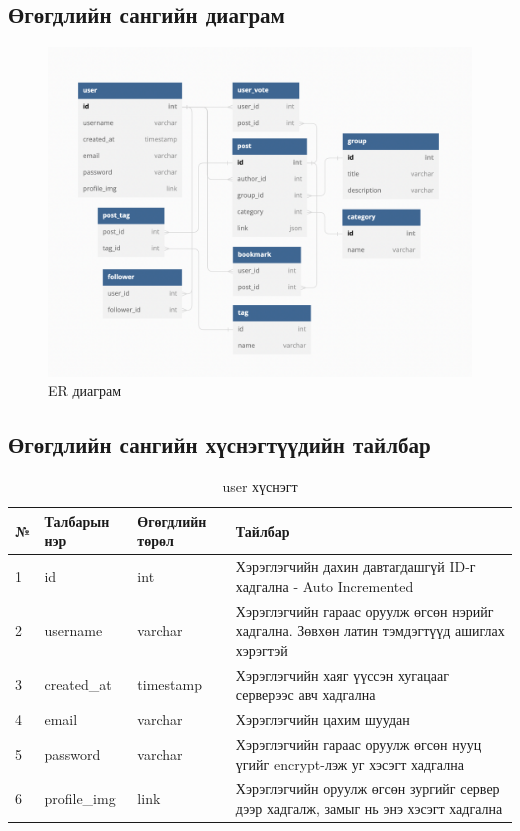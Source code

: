 \subsection{Өгөгдлийн сангийн диаграм}
\begin{figure}[h]
	\centering
	\includegraphics[width=15cm]{images/erdiagram.png}
	\caption{ER диаграм}
	\label{fig:erd}
\end{figure}

\subsection{Өгөгдлийн сангийн хүснэгтүүдийн тайлбар}

\begin{table}[h]
	\caption{user хүснэгт}
	\begin{tabular}{|l|l|l|p{8cm}|}
	\hline
	№ &  Талбарын нэр & Өгөгдлийн төрөл & Тайлбар \\ \hline
	1 &  id & int & Хэрэглэгчийн дахин давтагдашгүй ID-г хадгална - Auto Incremented \\ \hline
	2 &  username & varchar & Хэрэглэгчийн гараас оруулж өгсөн нэрийг хадгална. Зөвхөн латин тэмдэгтүүд ашиглах хэрэгтэй \\ \hline
	3 &  created\_at & timestamp & Хэрэглэгчийн хаяг үүссэн хугацааг серверээс авч хадгална \\ \hline
	4 &  email & varchar & Хэрэглэгчийн цахим шуудан \\ \hline
	5 &  password & varchar & Хэрэглэгчийн гараас оруулж өгсөн нууц үгийг encrypt-лэж уг хэсэгт хадгална \\ \hline
	6 &  profile\_img & link & Хэрэглэгчийн оруулж өгсөн зургийг сервер дээр хадгалж, замыг нь энэ хэсэгт хадгална \\ \hline

\end{tabular}
\end{table}

